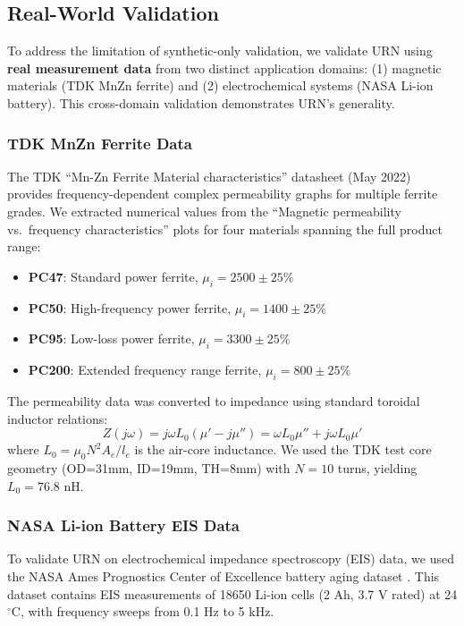 \documentclass{ieeeaccess}
\begin{document}
\subsection{Real-World Validation}
\label{sec:realworld}

To address the limitation of synthetic-only validation, we validate URN using \textbf{real measurement data} from two distinct application domains: (1) magnetic materials (TDK MnZn ferrite) and (2) electrochemical systems (NASA Li-ion battery). This cross-domain validation demonstrates URN's generality.

\subsubsection{TDK MnZn Ferrite Data}
The TDK ``Mn-Zn Ferrite Material characteristics'' datasheet (May 2022) \cite{tdk_ferrite} provides frequency-dependent complex permeability graphs for multiple ferrite grades. We extracted numerical values from the ``Magnetic permeability vs.\ frequency characteristics'' plots for four materials spanning the full product range:
\begin{itemize}
\item \textbf{PC47}: Standard power ferrite, $\mu_i = 2500 \pm 25\%$
\item \textbf{PC50}: High-frequency power ferrite, $\mu_i = 1400 \pm 25\%$
\item \textbf{PC95}: Low-loss power ferrite, $\mu_i = 3300 \pm 25\%$
\item \textbf{PC200}: Extended frequency range ferrite, $\mu_i = 800 \pm 25\%$
\end{itemize}

The permeability data was converted to impedance using standard toroidal inductor relations:
\begin{equation}
Z(j\omega) = j\omega L_0 (\mu' - j\mu'') = \omega L_0 \mu'' + j\omega L_0 \mu'
\end{equation}
where $L_0 = \mu_0 N^2 A_e / l_e$ is the air-core inductance. We used the TDK test core geometry (OD=31mm, ID=19mm, TH=8mm) with $N=10$ turns, yielding $L_0 = 76.8$ nH.

\subsubsection{NASA Li-ion Battery EIS Data}
To validate URN on electrochemical impedance spectroscopy (EIS) data, we used the NASA Ames Prognostics Center of Excellence battery aging dataset \cite{nasa_battery}. This dataset contains EIS measurements of 18650 Li-ion cells (2 Ah, 3.7 V rated) at 24$^\circ$C, with frequency sweeps from 0.1 Hz to 5 kHz.
\end{document}

